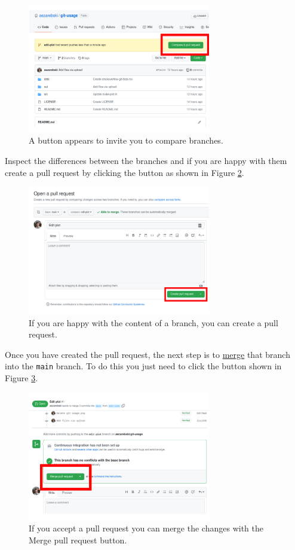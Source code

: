 \documentclass[11pt,onecolumn]{scrartcl}
\begin{document}
\begin{figure}[htbp]
\centering
\includegraphics[width=8cm]{./pull-request.png}
\caption{\label{fig:pull-request}A button appears to invite you to compare branches.}
\end{figure}

Inspect the differences between the branches and if you are happy with them
create a pull request by clicking the button as shown in Figure
\ref{fig:create-pull-request}.

\begin{figure}[htbp]
\centering
\includegraphics[width=8cm]{./create-pull-request.png}
\caption{\label{fig:create-pull-request}If you are happy with the content of a branch, you can create a pull request.}
\end{figure}

Once you have created the pull request, the next step is to \hyperref[sec:org03d5d05]{merge} that branch
into the \texttt{main} branch. To do this you just need to click the button shown in
Figure \ref{fig:merge-pull-request}.

\begin{figure}[htbp]
\centering
\includegraphics[width=8cm]{./merge-pull-request.png}
\caption{\label{fig:merge-pull-request}If you accept a pull request you can merge the changes with the Merge pull request button.}
\end{figure}
\end{document}
